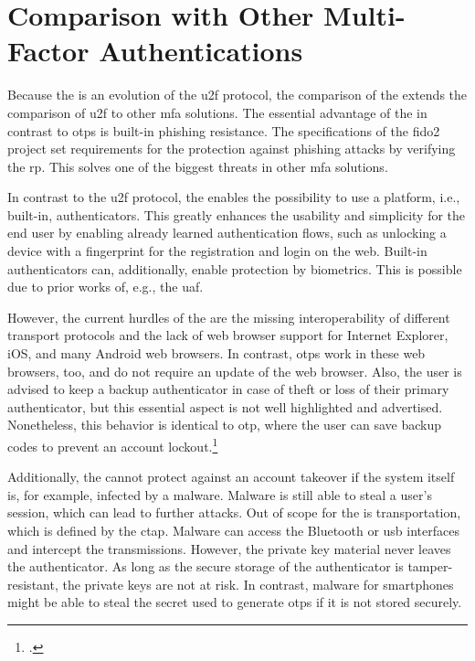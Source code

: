 \section{Comparison with Other Multi-Factor Authentications}
\label{chapter:comparison}

Because the \wa{} is an evolution of the \gls{u2f} protocol, the comparison of the \wa{} extends the comparison of \gls{u2f} to other \gls{mfa} solutions. The essential advantage of the \wa{} in contrast to \glspl{otp} is built-in phishing resistance. The specifications of the \gls{fido}2 project set requirements for the protection against phishing attacks by verifying the \gls{rp}. This solves one of the biggest threats in other \gls{mfa} solutions.

In contrast to the \gls{u2f} protocol, the \wa{} enables the possibility to use a platform, i.e., built-in, authenticators. This greatly enhances the usability and simplicity for the end user by enabling already learned authentication flows, such as unlocking a device with a fingerprint for the registration and login on the web. Built-in authenticators can, additionally, enable protection by biometrics. This is possible due to prior works of, e.g., the \gls{uaf}.

 However, the current hurdles of the \wa{} are the missing interoperability of different transport protocols and the lack of web browser support for Internet Explorer, iOS, and many Android web browsers. In contrast, \glspl{otp} work in these web browsers, too, and do not require an update of the web browser. Also, the user is advised to keep a backup authenticator in case of theft or loss of their primary authenticator, but this essential aspect is not well highlighted and advertised. Nonetheless, this behavior is identical to \gls{otp}, where the user can save backup codes to prevent an account lockout.\footcites[See][36]{10.1007/978-3-319-45931-8_3}
 
 Additionally, the \wa{} cannot protect against an account takeover if the system itself is, for example, infected by a malware. Malware is still able to steal a user's session, which can lead to further attacks. Out of scope for the \wa{} is transportation, which is defined by the \gls{ctap}. Malware can access the Bluetooth or \gls{usb} interfaces and intercept the transmissions. However, the private key material never leaves the authenticator. As long as the secure storage of the authenticator is tamper-resistant, the private keys are not at risk. In contrast, malware for smartphones might be able to steal the secret used to generate \glspl{otp} if it is not stored securely.
 

